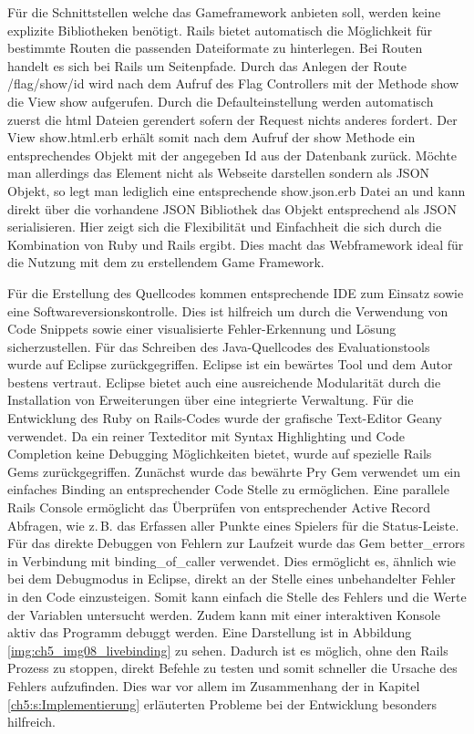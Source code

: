 Für die Schnittstellen welche das Gameframework anbieten soll, werden keine explizite Bibliotheken benötigt. Rails bietet automatisch die Möglichkeit für bestimmte Routen die passenden Dateiformate zu hinterlegen. Bei Routen handelt es sich bei Rails um Seitenpfade. Durch das Anlegen der Route \glqq /flag/show/{id}\grqq{} wird nach dem Aufruf des Flag Controllers mit der Methode show die View show aufgerufen. Durch die Defaulteinstellung werden automatisch zuerst die html Dateien gerendert sofern der Request nichts anderes fordert. Der View show.html.erb erhält somit nach dem Aufruf der show Methode ein entsprechendes Objekt mit der angegeben Id aus der Datenbank zurück. Möchte man allerdings das Element nicht als Webseite darstellen sondern als JSON Objekt, so legt man lediglich eine entsprechende show.json.erb Datei an und kann direkt über die vorhandene JSON Bibliothek das Objekt entsprechend als JSON serialisieren.
Hier zeigt sich die Flexibilität und Einfachheit die sich durch die Kombination von Ruby und Rails ergibt. Dies macht das Webframework ideal für die Nutzung mit dem zu erstellendem Game Framework.

Für die Erstellung des Quellcodes kommen entsprechende IDE zum Einsatz sowie eine Softwareversionskontrolle. Dies ist hilfreich um durch die Verwendung von Code Snippets sowie einer visualisierte Fehler-Erkennung und Lösung sicherzustellen.
Für das Schreiben des Java-Quellcodes des Evaluationstools wurde auf Eclipse zurückgegriffen. Eclipse ist ein bewärtes Tool und dem Autor bestens vertraut. Eclipse bietet auch eine ausreichende Modularität durch die Installation von Erweiterungen über eine integrierte Verwaltung.
Für die Entwicklung des Ruby on Rails-Codes wurde der grafische Text-Editor Geany verwendet. Da ein reiner Texteditor mit Syntax Highlighting und Code Completion keine Debugging Möglichkeiten bietet, wurde auf spezielle Rails Gems zurückgegriffen.
Zunächst wurde das bewährte \glqq Pry\grqq{} Gem verwendet um ein einfaches Binding an entsprechender Code Stelle zu ermöglichen. Eine parallele Rails Console ermöglicht das Überprüfen von entsprechender Active Record Abfragen, wie z.\,B. das Erfassen aller Punkte eines Spielers für die Status-Leiste. Für das direkte Debuggen von Fehlern zur Laufzeit  wurde das Gem \glqq better\_errors\grqq{} in Verbindung mit \glqq binding\_of\_caller\grqq{} verwendet. Dies ermöglicht es, ähnlich wie bei dem Debugmodus in Eclipse, direkt an der Stelle eines unbehandelter Fehler in den Code einzusteigen. Somit kann einfach die Stelle des Fehlers und die Werte der Variablen untersucht werden. Zudem kann mit einer interaktiven Konsole aktiv das Programm debuggt werden. Eine Darstellung ist in Abbildung \ref{img:ch5_img08_livebinding} zu sehen. Dadurch ist es möglich, ohne den Rails Prozess zu stoppen, direkt Befehle zu testen und somit schneller die Ursache des Fehlers aufzufinden. Dies war vor allem im Zusammenhang der in Kapitel \ref{ch5:s:Implementierung} erläuterten Probleme bei der Entwicklung besonders hilfreich.


